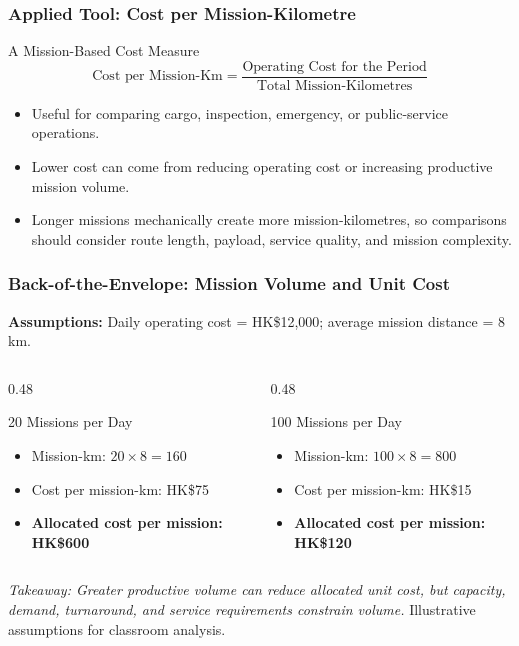 \documentclass{beamer}
\begin{document}
\begin{frame}[t]
  \frametitle{Applied Tool: Cost per Mission-Kilometre}
  \begin{block}{A Mission-Based Cost Measure}
  \[
    \text{Cost per Mission-Km}
    =
    \frac{\text{Operating Cost for the Period}}{\text{Total Mission-Kilometres}}
  \]
  \end{block}
  \begin{itemize}
    \item Useful for comparing cargo, inspection, emergency, or public-service operations.
    \item Lower cost can come from reducing operating cost or increasing productive mission volume.
    \item Longer missions mechanically create more mission-kilometres, so comparisons should consider route length, payload, service quality, and mission complexity.
  \end{itemize}
\end{frame}

\begin{frame}[t,shrink=10]
  \frametitle{Back-of-the-Envelope: Mission Volume and Unit Cost}
  \textbf{Assumptions:} Daily operating cost = HK\$12,000; average mission distance = 8 km.
  \begin{columns}[T]
    \begin{column}{0.48\textwidth}
      \begin{block}{20 Missions per Day}
      \begin{itemize}
        \item Mission-km: $20\times8=160$
        \item Cost per mission-km: HK\$75
        \item \textbf{Allocated cost per mission: HK\$600}
      \end{itemize}
      \end{block}
    \end{column}
    \begin{column}{0.48\textwidth}
      \begin{block}{100 Missions per Day}
      \begin{itemize}
        \item Mission-km: $100\times8=800$
        \item Cost per mission-km: HK\$15
        \item \textbf{Allocated cost per mission: HK\$120}
      \end{itemize}
      \end{block}
    \end{column}
  \end{columns}
  \textit{Takeaway: Greater productive volume can reduce allocated unit cost, but capacity, demand, turnaround, and service requirements constrain volume.}
  \vfill
  {\tiny Illustrative assumptions for classroom analysis.}
\end{frame}
\end{document}
